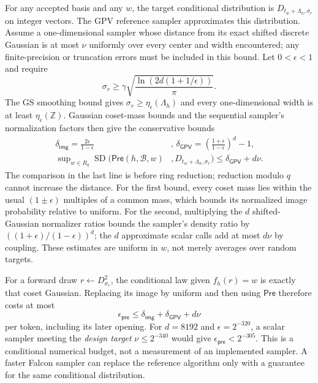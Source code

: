 \documentclass[lettersize,journal]{IEEEtran}
\begin{document}
	For any accepted basis and any $w$, the target conditional distribution is
	$D_{t_w+\Lambda_h,\sigma_r}$ on integer vectors. The GPV reference sampler approximates this distribution. Assume a one-dimensional
	sampler whose distance from its exact shifted discrete Gaussian is at
	most $\nu$ uniformly over every center and width encountered; any
	finite-precision or truncation errors must be included in this bound.
	Let $0<\epsilon<1$ and require
	\[
	\sigma_r\geq\gamma
	\sqrt{\frac{\ln(2d(1+1/\epsilon))}{\pi}}.
	\]
	The GS smoothing bound gives
	$\sigma_r\geq\eta_\epsilon(\Lambda_h)$ and every one-dimensional
	width is at least $\eta_\epsilon(\mathbb Z)$. Gaussian coset-mass
	bounds and the sequential sampler's normalization factors then give
	the conservative bounds
	\[
	\begin{aligned}
		\delta_{\mathsf{img}}=\frac{2\epsilon}{1-\epsilon}&,\,
		\delta_{\mathsf{GPV}}=\left(\frac{1+\epsilon}{1-\epsilon}\right)^d-1,\\
		\sup\nolimits_{w\in R_q}\operatorname{SD}\bigl(
		\mathsf{Pre}(h,\mathcal B,w)&,
		D_{t_w+\Lambda_h,\sigma_r}\bigr)
		\leq\delta_{\mathsf{GPV}}+d\nu.
	\end{aligned}
	\]
	The comparison in the last line is before ring reduction; reduction
	modulo $q$ cannot increase the distance. For the first bound, every
	coset mass lies within the usual $(1\pm\epsilon)$ multiples of a
	common mass, which bounds its normalized image probability relative
	to uniform. For the second, multiplying the $d$ shifted-Gaussian
	normalizer ratios bounds the sampler's density ratio by
	$((1+\epsilon)/(1-\epsilon))^d$; the $d$ approximate scalar calls
	add at most $d\nu$ by coupling. These estimates are uniform in $w$,
	not merely averages over random targets.
	
	For a forward draw $r\leftarrow D_{\sigma_r}^{2}$, the conditional
	law given $f_h(r)=w$ is exactly that coset Gaussian. Replacing its
	image by uniform and then using $\mathsf{Pre}$ therefore costs at most
	\[
	\epsilon_{\mathsf{pre}}
	\leq\delta_{\mathsf{img}}+\delta_{\mathsf{GPV}}+d\nu
	\]
	per token, including its later opening. For $d=8192$ and
	$\epsilon=2^{-320}$, a scalar sampler meeting the \emph{design target}
	$\nu\leq2^{-340}$ would give $\epsilon_{\mathsf{pre}}<2^{-305}$.
	This is a conditional numerical budget, not a measurement of an
	implemented sampler. A faster Falcon sampler can replace the reference
	algorithm only with a guarantee for the same conditional distribution.
	
\end{document}
